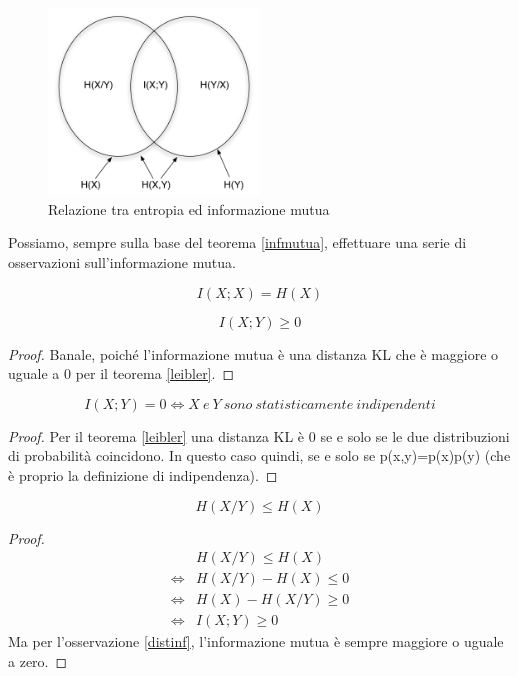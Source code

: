 \begin{figure}[htbp]
\begin{center}
	\includegraphics[width=0.5\textwidth]{img/mutua.pdf}
\caption{Relazione tra entropia ed informazione mutua}
\label{fig:mutua}
\end{center}
\end{figure}

\noindent
Possiamo, sempre sulla base del teorema \ref{infmutua}, effettuare una serie di osservazioni sull'informazione mutua.

\begin{osservazione}
\[
 I(X;X)=H(X)
\]
\end{osservazione}

\begin{osservazione}
 \[
   I(X;Y) \ge 0  
 \]
 \begin{proof}
  Banale, poiché l'informazione mutua è una distanza KL che è maggiore o uguale a 0 per il teorema \ref{leibler}.
 \end{proof}
\label{distinf}
\end{osservazione}

\begin{osservazione}
 \[
   I(X;Y)=0 \iff X \ e \ Y \ sono \ statisticamente \ indipendenti  
 \]
 \begin{proof}
  Per il teorema \ref{leibler} una distanza KL è 0 se e solo se le due distribuzioni di probabilità coincidono.
  In questo caso quindi, se e solo se p(x,y)=p(x)p(y) (che è proprio la definizione di indipendenza).
 \end{proof}
 \label{mutuaindip}
\end{osservazione}

\begin{osservazione}
 \[
  H(X/Y) \le H(X)
 \]
  \begin{proof}
   \[\begin{split}
     & H(X/Y) \le H(X) \\ 
     \iff & H(X/Y) -H(X) \le 0 \\
     \iff & H(X)-H(X/Y) \ge 0 \\
     \iff & I(X;Y) \ge 0
     \end{split}
   \]
  Ma per l'osservazione \ref{distinf}, l'informazione mutua è sempre maggiore o uguale a zero.
  \end{proof}

 \label{condizionamento}
\end{osservazione}

